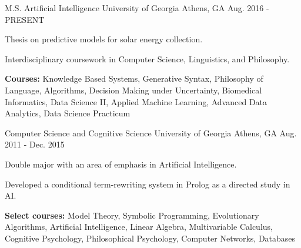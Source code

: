 \begin{cventries}

\cventry
{M.S. Artificial Intelligence}
{University of Georgia}
{Athens, GA}
{Aug. 2016 - PRESENT}
{\begin{cvitems}
    \item {Thesis on predictive models for solar energy collection.}
    \item {Interdisciplinary coursework in Computer Science, Linguistics, and Philosophy.}
    \item {\textbf{Courses:} Knowledge Based Systems, Generative Syntax, Philosophy of Language, Algorithms, Decision Making under Uncertainty, Biomedical Informatics, Data Science II, Applied Machine Learning, Advanced Data Analytics, Data Science Practicum}
\end{cvitems}}

\cventry
{Computer Science and Cognitive Science}
{University of Georgia}
{Athens, GA}
{Aug. 2011 - Dec. 2015}
{\begin{cvitems}
    \item {Double major with an area of emphasis in Artificial Intelligence.}
    \item {Developed a conditional term-rewriting system in Prolog as a directed study in AI.}
    \item {\textbf{Select courses:} Model Theory, Symbolic Programming, Evolutionary Algorithms, Artificial Intelligence, Linear Algebra, Multivariable Calculus, Cognitive Psychology, Philosophical Psychology, Computer Networks, Databases}
\end{cvitems}}

\end{cventries}
